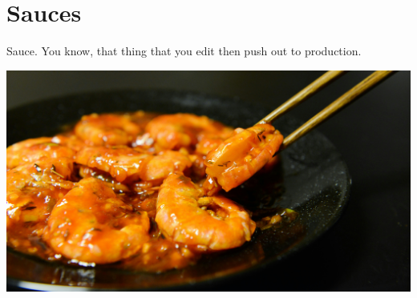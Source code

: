 \chapter{Sauces}

Sauce. You know, that thing that you edit then push out to production.

\centering
\includegraphics{images/pexels-photo-699544.jpg}